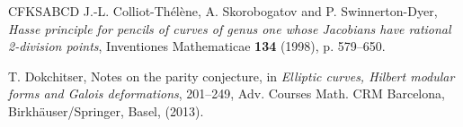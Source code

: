 \documentclass[10pt]{amsart}
\numberwithin{equation}{section}
\theoremstyle{remark}
\theoremstyle{definition}
\theoremstyle{definition}
\theoremstyle{definition}
\theoremstyle{definition}
\theoremstyle{definition}
\theoremstyle{definition}
\theoremstyle{definition}
\theoremstyle{definition}
\begin{document}
\begin{thebibliography}{CFKSABCD}
J.-L. Colliot-Th\'el\`ene, A. Skorobogatov and P. Swinnerton-Dyer, \textit{Hasse principle for
pencils of curves of genus one whose Jacobians have rational 2-division points}, Inventiones Mathematicae \textbf{134} (1998), p. 579–650. 
%              
% 
%
%              
%              
%              
% 
%  
%  
%  
%  
%  

 T. Dokchitser, Notes on the parity conjecture, in {\it Elliptic curves, Hilbert modular forms and Galois deformations}, 201--249, Adv. Courses Math. CRM Barcelona, Birkh\"auser/Springer, Basel, (2013).


\end{thebibliography}
\end{document}
